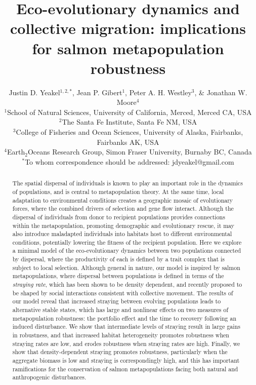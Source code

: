 \documentclass{revtex4}
\begin{document}
\title{Eco-evolutionary dynamics and collective migration: implications for salmon metapopulation robustness}
\author{
Justin D. Yeakel${}^{1,2,*}$, Jean P. Gibert${}^{1}$, Peter A. H. Westley${}^{3}$, \& Jonathan W. Moore${}^{4}$ \\
${}^1$School of Natural Sciences, University of California, Merced, Merced CA, USA \\
${}^2$The Santa Fe Institute, Santa Fe NM, USA \\
${}^3$College of Fisheries and Ocean Sciences, University of Alaska, Fairbanks, Fairbanks AK, USA \\
${}^4$Earth${}_2$Oceans Research Group, Simon Fraser University, Burnaby BC, Canada \\
${}^*$To whom correspondence should be addressed: jdyeakel@gmail.com
}




\begin{abstract} %
The spatial dispersal of individuals is known to play an important role in the dynamics of populations, and is central to metapopulation theory.
At the same time, local adaptation to environmental conditions creates a geographic mosaic of evolutionary forces, where the combined drivers of selection and gene flow interact.
Although the dispersal of individuals from donor to recipient populations provides connections within the metapopulation, promoting demographic and evolutionary rescue, it may also introduce maladapted individuals into habitats host to different environmental conditions, potentially lowering the fitness of the recipient population.
Here we explore a minimal model of the eco-evolutionary dynamics between two populations connected by dispersal, where the productivity of each is defined by a trait complex that is subject to local selection.
Although general in nature, our model is inspired by salmon metapopulations, where dispersal between populations is defined in terms of the \emph{straying rate}, which has been shown to be density dependent, and recently proposed to be shaped by social interactions consistent with collective movement. %
The results of our model reveal that increased straying between evolving populations leads to alternative stable states, which has large and nonlinear effects on two measures of metapopulation robustness: the portfolio effect and the time to recovery following an induced disturbance.
We show that intermediate levels of straying result in large gains in robustness, and that increased habitat heterogeneity promotes robustness when straying rates are low, and erodes robustness when straying rates are high.
Finally, we show that density-dependent straying promotes robustness, particularly when the aggregate biomass is low and straying is correspondingly high, and this has important ramifications for the conservation of salmon metapopulations facing both natural and anthropogenic disturbances.
\end{abstract} 
\end{document}
